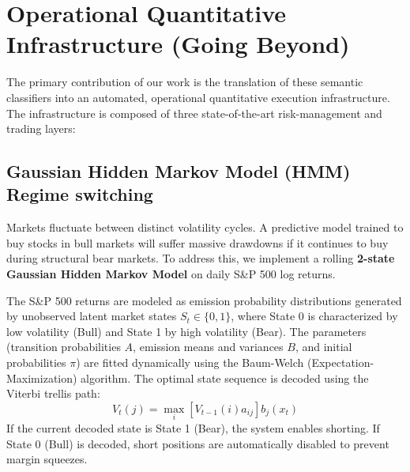 \documentclass[10pt,journal,compsoc]{IEEEtran}
\begin{document}
\section{Operational Quantitative Infrastructure (Going Beyond)}
The primary contribution of our work is the translation of these semantic classifiers into an automated, operational quantitative execution infrastructure. The infrastructure is composed of three state-of-the-art risk-management and trading layers:

\subsection{Gaussian Hidden Markov Model (HMM) Regime switching}
Markets fluctuate between distinct volatility cycles. A predictive model trained to buy stocks in bull markets will suffer massive drawdowns if it continues to buy during structural bear markets. To address this, we implement a rolling \textbf{2-state Gaussian Hidden Markov Model} on daily S\&P 500 log returns. 

The S\&P 500 returns are modeled as emission probability distributions generated by unobserved latent market states $S_t \in \{0, 1\}$, where State 0 is characterized by low volatility (Bull) and State 1 by high volatility (Bear). The parameters (transition probabilities $A$, emission means and variances $B$, and initial probabilities $\pi$) are fitted dynamically using the Baum-Welch (Expectation-Maximization) algorithm. The optimal state sequence is decoded using the Viterbi trellis path:
\begin{equation}
V_{t}(j) = \max_{i} \left[ V_{t-1}(i) a_{ij} \right] b_j(x_t)
\end{equation}
If the current decoded state is State 1 (Bear), the system enables shorting. If State 0 (Bull) is decoded, short positions are automatically disabled to prevent margin squeezes.
\end{document}
